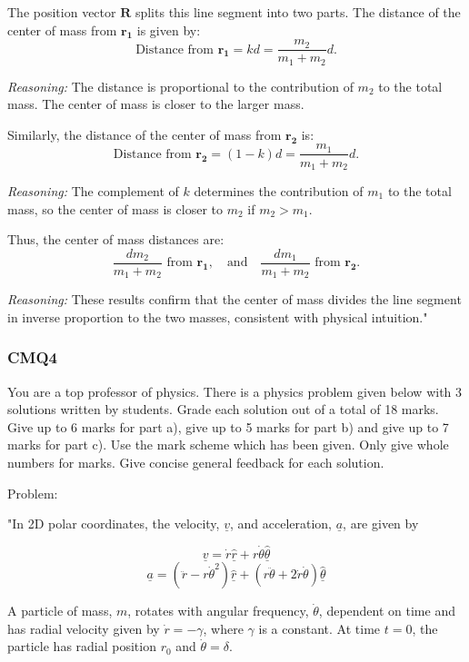 The position vector $\mathbf{R}$ splits this line segment into two parts. The distance of the center of mass from $\mathbf{r_1}$ is given by:
\[
\text{Distance from } \mathbf{r_1} = k d = \frac{m_2}{m_1 + m_2} d.
\]

\textit{Reasoning:} The distance is proportional to the contribution of $m_2$ to the total mass. The center of mass is closer to the larger mass.

Similarly, the distance of the center of mass from $\mathbf{r_2}$ is:
\[
\text{Distance from } \mathbf{r_2} = (1 - k) d = \frac{m_1}{m_1 + m_2} d.
\]

\textit{Reasoning:} The complement of $k$ determines the contribution of $m_1$ to the total mass, so the center of mass is closer to $m_2$ if $m_2 > m_1$.

Thus, the center of mass distances are:
\[
\frac{dm_2}{m_1 + m_2} \text{ from } \mathbf{r_1}, \quad \text{and} \quad \frac{dm_1}{m_1 + m_2} \text{ from } \mathbf{r_2}.
\]

\textit{Reasoning:} These results confirm that the center of mass divides the line segment in inverse proportion to the two masses, consistent with physical intuition."


\subsubsection{CMQ4}

You are a top professor of physics. There is a physics problem given below with 3 solutions written by students. Grade each solution out of a total of 18 marks. Give up to 6 marks for part a), give up to 5 marks for part b) and give up to 7 marks for part c). Use the mark scheme which has been given. Only give whole numbers for marks. Give concise general feedback for each solution.

Problem:

"In 2D polar coordinates, the velocity, \( \underline{v} \), and acceleration, \( \underline{a} \), are given by 

\[ 
\underline{v} = \dot{r} \underline{\hat{r}} + r \dot{\theta} \underline{\hat{\theta}} 
\]
\[ 
\underline{a} = (\ddot{r} - r \dot{\theta}^{2}) \underline{\hat{r}} + (r \ddot{\theta} + 2\dot{r}\dot{\theta} ) \underline{\hat{\theta}} 
\]
    
A particle of mass, \( m \), rotates with angular frequency, \( \dot{\theta} \), dependent on time and has radial velocity given by \( \dot{r} = - \gamma \), where \( \gamma \) is a constant. At time \( t = 0 \), the particle has radial position \( r_{0} \) and \( \dot{\theta} = \delta \). 
    
